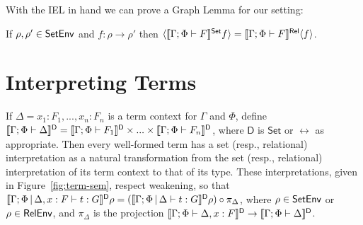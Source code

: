 \documentclass[runningheads]{llncs}
\newcommand{\set}{\mathsf{Set}}
\begin{document}
With the IEL in hand we can prove a Graph Lemma for our setting:

\vspace*{-0.05in}

\begin{lemma}
  \label{lem:graph}
  If $\rho, \rho' \in \mathsf{SetEnv}$ and $f : \rho \to \rho'$
  then $\graph{\setsem{\Gamma; \Phi \vdash F} f} =
\relsem{\Gamma; \Phi \vdash F}\graph{f}$.
\end{lemma}



\vspace*{-0.25in}

\section{Interpreting Terms}\label{sec:term-interp}

\vspace*{-0.1in}

If $\Delta = x_1 : F_1,...,x_n : F_n$ is a term context for $\Gamma$
and $\Phi$, define $\llbracket{\Gamma;\Phi \vdash \Delta}\rrbracket^{\mathsf{D}} =
\llbracket{\Gamma;\Phi \vdash F_1}\rrbracket^{\mathsf{D}} \times ... \times
\llbracket{\Gamma;\Phi \vdash F_n}\rrbracket^{\mathsf{D}}$, where $\mathsf D$ is
$\set$ or $\rel$ as appropriate. Then every well-formed term has a set
(resp., relational) interpretation as a natural transformation from
the set (resp., relational) interpretation of its term context to that
of its type. These interpretations, given in
Figure~\ref{fig:term-sem}, respect weakening, so that
$\llbracket{\Gamma;\Phi \,|\, \Delta, x : F \vdash t : G}\rrbracket^{\mathsf D}\rho =
(\llbracket{\Gamma;\Phi \,|\, \Delta \vdash t : G}\rrbracket^{\mathsf D}\rho) \circ
\pi_{\Delta}$, where $\rho \in \mathsf{SetEnv}$ or $\rho \in\mathsf{RelEnv}$, and
$\pi_{\Delta}$ is the projection $\llbracket{\Gamma;\Phi \vdash \Delta, x :
  F}\rrbracket^{\mathsf D} \to \llbracket{\Gamma;\Phi \vdash \Delta}\rrbracket^{\mathsf D}$.
\end{document}

